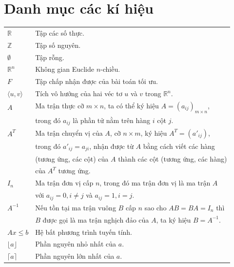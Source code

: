 \documentclass[12pt,a4paper]{report}
\begin{document}
	\vspace{1cm}
	\newpage
	
	
	\tableofcontents
	\chapter*{Danh mục các kí hiệu}
	\thispagestyle{fancy}
	\begin{longtable}{l l}
		
		$\mathbb{R}$ & Tập các số thực.\\
        $\mathbb{Z}$ & Tập số nguyên. \\
		$\emptyset $ & Tập rỗng.\\
		$\mathbb{R}^n$ & Không gian Euclide $n$-chiều.\\
		$F$ & Tập chấp nhận được của bài toán tối ưu.\\
		$\langle u, v \rangle$ & Tích vô hướng của hai véc tơ $u$ và $v$ trong $\mathbb{R}^n$.\\
        $A$ & Ma trận thực cỡ $m \times n$, ta có thể ký hiệu $A = (a_{ij})_{m \times n}$, \\
        & trong đó $a_{ij}$ là phần tử nằm trên hàng $i$ cột $j$. \\
        $A^T$ & Ma trận chuyển vị của $A$, cỡ $n \times m$, ký hiệu $A^T = (a'_{ij})$, \\
        & trong đó $a'_{ij} = a_{ji}$, nhận được từ $A$ bằng cách viết các hàng \\
        & (tương ứng, các cột) của $A$ thành các cột (tương ứng, các hàng) \\
        & của $A^T$ tương ứng. \\
        $I_n$ & Ma trận đơn vị cấp $n$, trong đó ma trận đơn vị là ma trận $A$ \\
        & với $a_{ij}=0, i \neq j$ và $a_{ij}=1, i = j$. \\
        $A^{-1}$ & Nếu tồn tại ma trận vuông $B$ cấp $n$ sao cho $AB=BA=I_n$ thì \\
        & $B$ được gọi là ma trận nghịch đảo của $A$, ta ký hiệu $B = A^{-1}$.\\
        $Ax \leq b$ & Hệ bất phương trình tuyến tính. \\
        $\lfloor a \rfloor$ & Phần nguyên nhỏ nhất của $a$. \\
        $\lceil a \rceil$ & Phần nguyên lớn nhất của $a$. \\
	\end{longtable}
\newpage
{} 
\end{document}
